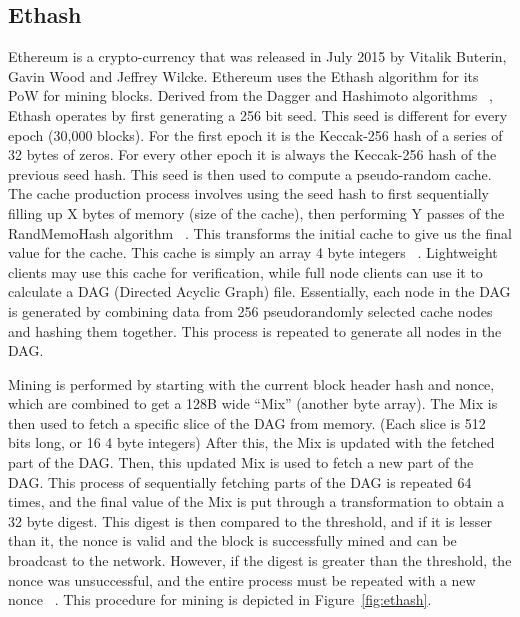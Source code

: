 \documentclass[runningheads]{llncs}
\begin{document}
\subsection{Ethash}
Ethereum is a crypto-currency that was released in July 2015 by Vitalik Buterin, Gavin Wood and Jeffrey Wilcke. Ethereum uses the Ethash algorithm for its PoW for mining blocks. Derived from the Dagger and Hashimoto algorithms ~\cite{dagger-hashimoto}, Ethash operates by first generating a 256 bit seed. This seed is different for every epoch (30,000 blocks). For the first epoch it is the Keccak-256 hash of a series of 32 bytes of zeros. For every other epoch it is always the Keccak-256 hash of the previous seed hash. This seed is then used to compute a pseudo-random cache. The cache production process involves using the seed hash to first sequentially filling up X bytes of memory (size of the cache), then performing Y passes of the RandMemoHash algorithm ~\cite{randmemohash}. This transforms the initial cache to give us the final value for the cache. This cache is simply an array 4 byte integers ~\cite{Ethmining}. Lightweight clients may use this cache for verification, while full node clients can use it to calculate a DAG (Directed Acyclic Graph) file. Essentially, each node in the DAG is generated by combining data from 256 pseudorandomly selected cache nodes and hashing them together. This process is repeated to generate all nodes in the DAG. 


Mining is performed by starting with the current block header hash and nonce, which are combined to get a 128B wide ``Mix'' (another byte array). The Mix is then used to fetch a specific slice of the DAG from memory. (Each slice is 512 bits long, or 16 4 byte integers) After this, the Mix is updated with the fetched part of the DAG. Then, this updated Mix is used to fetch a new part of the DAG. This process of sequentially fetching parts of the DAG is repeated 64 times, and the final value of the Mix is put through a transformation to obtain a 32 byte digest. This digest is then compared to the threshold, and if it is lesser than it, the nonce is valid and the block is successfully mined and can be broadcast to the network. However, if the digest is greater than the threshold, the nonce was unsuccessful, and the entire process must be repeated with a new nonce ~\cite{Ethmining}. This procedure for mining is depicted in Figure~\ref{fig:ethash}. 
\end{document}
